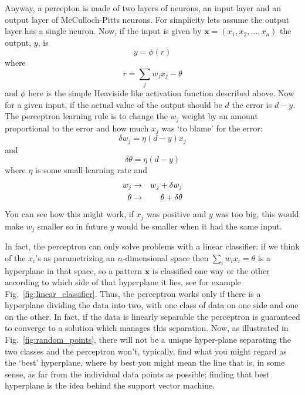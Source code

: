 \documentclass[12pt]{article}
\begin{document}
Anyway, a percepton is made of two layers of neurons, an input layer
and an output layer of McCulloch-Pitts neurons. For simplicity lets
assume the output layer
has a single neuron. Now, if the input is given by
$\textbf{x}=(x_1,x_2,\ldots,x_n)$ the output, $y$, is
\begin{equation}
y=\phi(r)
\end{equation}
where
\begin{equation}
r=\sum_j w_j x_j-\theta
\end{equation}
and $\phi$ here is the simple Heaviside like activation function
described above. Now for a given input, if the actual value of the
output should be $d$ the error is $d-y$. The perceptron learning rule
is to change the $w_j$ weight by an amount proportional to the error
and how much $x_j$ was \lq{}to blame\rq{} for the error:
\begin{equation}
\delta w_j=\eta (d-y) x_j
\end{equation}
and
\begin{equation}
\delta \theta =  \eta (d-y)
\end{equation}
where $\eta$ is some small learning rate and
\begin{eqnarray}
w_j&\rightarrow& w_j+\delta w_j\cr
\theta&\rightarrow& \theta+\delta\theta
\end{eqnarray}
You can see how this might work, if $x_j$ was positive and $y$ was too
big, this would make $w_j$ smaller so in future $y$ would be smaller
when it had the same input. 

In fact, the perceptron can only solve problems with a linear
classifier: if we think of the $x_i$'s as parametrizing an
$n$-dimensional space then $\sum_iw_ix_i=\theta$ is a hyperplane in
that space, so a pattern $\textbf{x}$ is classified one way or the
other according to which side of that hyperplane it lies, see for example Fig.~\ref{fig:linear_classifier}. Thus, the
perceptron works only if there is a hyperplane dividing the data into
two, with one class of data on one side and one on the other. In fact,
if the data is linearly separable the perceptron is guaranteed to
converge to a solution which manages this separation. Now, as
illustrated in Fig.~\ref{fig:random_points}, there will not be a unique
hyper-plane separating the two classes and the perceptron won't,
typically, find what you might regard as the \lq{}best\rq{}
hyperplane, where by best you might mean the line that is, in some
sense, as far from the individual data points as possible; finding
that best hyperplane is the idea behind the support vector machine.
\end{document}
